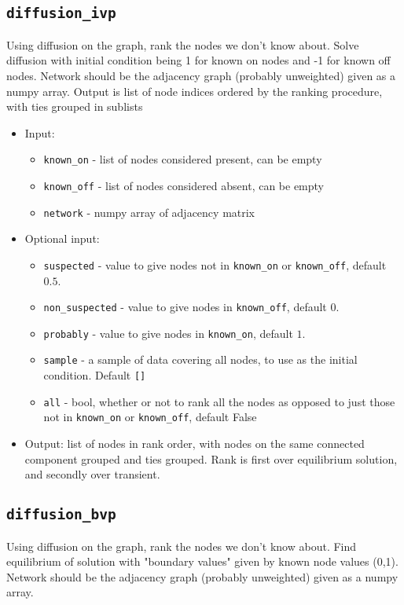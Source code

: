 \documentclass[10pt]{article}
\theoremstyle{definition}
\numberwithin{theorem}{section}
\numberwithin{definition}{section}
\numberwithin{lemma}{section}
\numberwithin{corollary}{section}
\numberwithin{clm}{section}
\numberwithin{rmk}{section}
\begin{document}
\cprotect \subsection{\verb|diffusion_ivp|}
Using diffusion on the graph, rank the nodes we don't know about. Solve diffusion with
initial condition being 1 for known on nodes and -1 for known off nodes. Network should be
the adjacency graph (probably unweighted) given as a numpy array.
Output is list of node indices ordered by the ranking procedure, with ties grouped in sublists
\begin{itemize}
	\item Input: 
	\begin{itemize}
		\item \verb|known_on| - list of nodes considered present, can be empty
		\item \verb|known_off| - list of nodes considered absent, can be empty
		\item \verb|network| - numpy array of adjacency matrix
	\end{itemize}
	\item Optional input:
	\begin{itemize}
		\item \verb|suspected| - value to give nodes not in \verb|known_on| or \verb|known_off|, default $0.5$.
		\item \verb|non_suspected| - value to give nodes in \verb|known_off|, default $0$.
		\item \verb|probably| - value to give nodes in \verb|known_on|, default $1$.
		\item \verb|sample| - a sample of data covering all nodes, to use as the initial condition. Default \verb|[]|
		\item \verb|all| - bool, whether or not to rank all the nodes as opposed to just those not in  \verb|known_on| or \verb|known_off|, default False
	\end{itemize}
	\item Output: list of nodes in rank order, with nodes on the same connected component grouped and ties grouped. Rank is first over equilibrium solution, and secondly over transient.
\end{itemize}

\cprotect \subsection{\verb|diffusion_bvp|}
Using diffusion on the graph, rank the nodes we don't know about. Find equilibrium
of solution with "boundary values" given by known node values (0,1). Network should be
the adjacency graph (probably unweighted) given as a numpy array.
\end{document}
